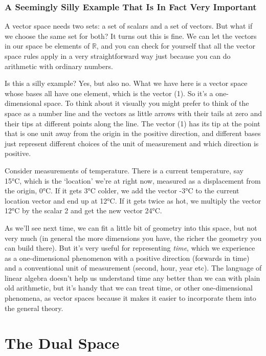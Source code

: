 \documentclass[oneside,english]{amsbook}
\numberwithin{section}{chapter}
\theoremstyle{plain}
\theoremstyle{definition}
\begin{document}
\subsection{A Seemingly Silly Example That Is In Fact Very Important}

A vector space needs two sets: a set of scalars and a set of vectors.
But what if we choose the same set for both? It turns out this is fine.
We can let the vectors in our space be elements of $\mathbb{R}$, and you
can check for yourself that all the vector space rules apply in a very
straightforward way just because you can do arithmetic with ordinary
numbers.

Is this a silly example? Yes, but also no. What we have here is a vector
space whose bases all have one element, which is the vector (1). So it's
a one-dimensional space. To think about it visually you might prefer to
think of the space as a number line and the vectors as little arrows
with their tails at zero and their tips at different points along the
line. The vector (1) has its tip at the point that is one unit away from
the origin in the positive direction, and different bases just represent
different choices of the unit of measurement and which direction is
positive.

Consider measurements of temperature. There is a current temperature,
say 15°C, which is the `location' we're at right now, measured as a
displacement from the origin, 0°C. If it gets 3°C colder, we add the
vector -3°C to the current location vector and end up at 12°C. If it
gets twice as hot, we multiply the vector 12°C by the scalar 2 and get
the new vector 24°C.

As we'll see next time, we can fit a little bit of geometry into this
space, but not very much (in general the more dimensions you have, the
richer the geometry you can build there). But it's very useful for
representing \emph{time}, which we experience as a one-dimensional
phenomenon with a positive direction (forwards in time) and a
conventional unit of measurement (second, hour, year etc). The language
of linear algebra doesn't help us understand time any better than we can
with plain old arithmetic, but it's handy that we can treat time, or
other one-dimensional phenomena, as vector spaces because it makes it
easier to incorporate them into the general theory.

\chapter{The Dual Space}
\end{document}
